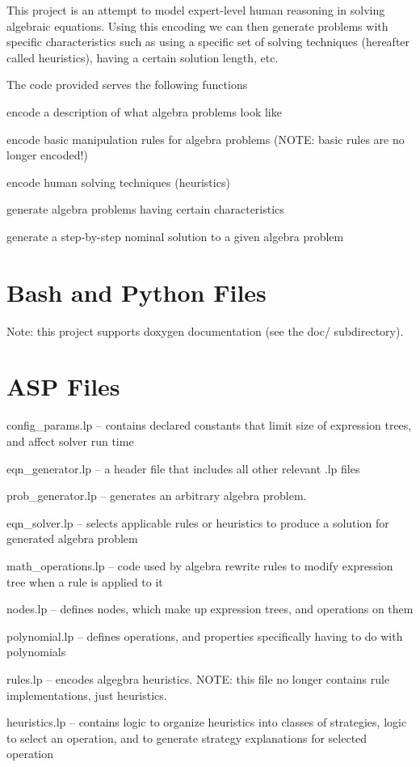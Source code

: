 This project is an attempt to model expert-\/level human reasoning in solving algebraic equations. Using this encoding we can then generate problems with specific characteristics such as using a specific set of solving techniques (hereafter called heuristics), having a certain solution length, etc.

The code provided serves the following functions
\begin{DoxyEnumerate}
\item encode a description of what algebra problems look like
\item encode basic manipulation rules for algebra problems (N\+O\+T\+E\+: basic rules are no longer encoded!)
\item encode human solving techniques (heuristics)
\item generate algebra problems having certain characteristics
\item generate a step-\/by-\/step nominal solution to a given algebra problem
\end{DoxyEnumerate}

\section*{Bash and Python Files }

Note\+: this project supports doxygen documentation (see the doc/ subdirectory).

\section*{A\+S\+P Files }


\begin{DoxyItemize}
\item config\+\_\+params.\+lp -- contains declared constants that limit size of expression trees, and affect solver run time
\item eqn\+\_\+generator.\+lp -- a \textquotesingle{}header\textquotesingle{} file that includes all other relevant .lp files
\item prob\+\_\+generator.\+lp -- generates an arbitrary algebra problem.
\item eqn\+\_\+solver.\+lp -- selects applicable rules or heuristics to produce a solution for generated algebra problem
\item math\+\_\+operations.\+lp -- code used by algebra rewrite rules to modify expression tree when a rule is applied to it
\item nodes.\+lp -- defines nodes, which make up expression trees, and operations on them
\item polynomial.\+lp -- defines operations, and properties specifically having to do with polynomials
\item rules.\+lp -- encodes algegbra heuristics. N\+O\+T\+E\+: this file no longer contains rule implementations, just heuristics.
\item heuristics.\+lp -- contains logic to organize heuristics into classes of strategies, logic to select an operation, and to generate \textquotesingle{}strategy explanations\textquotesingle{} for selected operation
\end{DoxyItemize}

